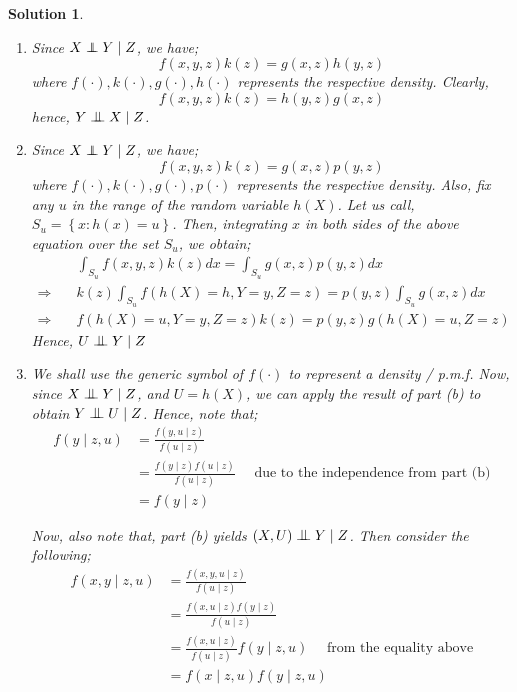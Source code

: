 \documentclass[12pt]{article}
\newcommand\independent{\protect\mathpalette{\protect\independenT}{\perp}}
\def\independenT#1#2{\mathrel{\rlap{$#1#2$}\mkern2mu{#1#2}}}
\theoremstyle{problemstyle}
\newtheorem*{solution*}{Solution}
\newcommand{\indep}{\mathrel{\text{\scalebox{1.07}{$\perp\mkern-10mu\perp$}}}}
\begin{document}
\begin{solution*}
\begin{enumerate}
	\item[(a)] Since $X \independent Y \mid Z$, we have;
	$$f(x, y, z)k(z) = g(x, z)h(y,z)$$
	where $f(\cdot), k(\cdot), g(\cdot), h(\cdot)$ represents the respective density.
	Clearly,
	$$f(x, y, z)k(z) = h(y,z)g(x, z)$$
	hence, $Y \indep X \mid Z$.
	
	\item[(b)] Since $X \independent Y \mid Z$, we have;
	$$f(x, y, z)k(z) = g(x, z)p(y,z)$$
	where $f(\cdot), k(\cdot), g(\cdot), p(\cdot)$ represents the respective density. Also, fix any $u$ in the range of the random variable $h(X)$. Let us call, $S_u = \left\{ x: h(x) = u \right\}$. Then, integrating $x$ in both sides of the above equation over the set $S_u$, we obtain;
	\begin{align*}
		& \int_{S_u} f(x, y, z)k(z)dx = \int_{S_u} g(x, z)p(y,z)dx\\
		\Rightarrow \quad & k(z) \int_{S_u}f(h(X) = h, Y = y, Z = z)  = p(y,z)\int_{S_u} g(x, z)dx\\
		\Rightarrow \quad & f(h(X) = u, Y = y, Z = z) k(z) = p(y, z) g(h(X) = u, Z = z)
	\end{align*}
	Hence, $U \indep Y \mid Z$
	
	\item[(c)] We shall use the generic symbol of $f(\cdot)$ to represent a density / p.m.f. Now, since $X \indep Y \mid Z$, and $U = h(X)$, we can apply the result of part (b) to obtain $Y \indep U \mid Z$. Hence, note that;
	\begin{align*}
		f(y \mid z, u) & = \frac{f(y, u \mid z)}{f(u \mid z)}\\
		& = \frac{f(y \mid z)f(u \mid z)}{f(u \mid z)} \quad \text{ due to the independence from part (b)}\\
		& = f(y \mid z)
	\end{align*}
	
	Now, also note that, part (b) yields $(X, U) \indep Y \mid Z$. Then consider the following;
	\begin{align*}
		f(x, y \mid z, u) & = \frac{f(x, y, u \mid z)}{f(u \mid z)}\\
		& = \frac{f(x, u \mid z)f(y \mid z)}{f(u \mid z)}\\
		& = \frac{f(x, u \mid z)}{f(u \mid z)}f(y \mid z, u) \quad \text{ from the equality above}\\
		& = f(x \mid z, u)f(y \mid z, u)
	\end{align*}
	

\end{enumerate}
\end{solution*}
\end{document}
